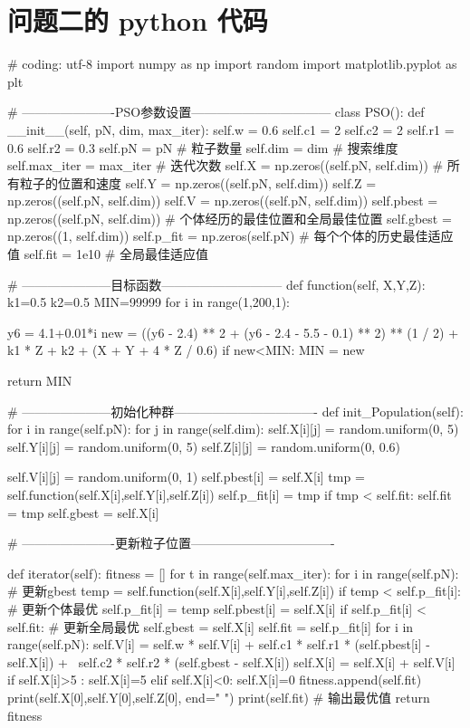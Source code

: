 \documentclass{MathorCupmodeling}
\begin{document}
	\section{问题二的 python 代码}
	\begin{python}
		# coding: utf-8
		import numpy as np
		import random
		import matplotlib.pyplot as plt
		
		
		# ----------------------PSO参数设置---------------------------------
		class PSO():
			def __init__(self, pN, dim, max_iter):
				self.w = 0.6
				self.c1 = 2
				self.c2 = 2
				self.r1 = 0.6
				self.r2 = 0.3
				self.pN = pN  # 粒子数量
				self.dim = dim  # 搜索维度
				self.max_iter = max_iter  # 迭代次数
				self.X = np.zeros((self.pN, self.dim))  # 所有粒子的位置和速度
				self.Y = np.zeros((self.pN, self.dim))
				self.Z = np.zeros((self.pN, self.dim))
				self.V = np.zeros((self.pN, self.dim))
				self.pbest = np.zeros((self.pN, self.dim))  # 个体经历的最佳位置和全局最佳位置
				self.gbest = np.zeros((1, self.dim))
				self.p_fit = np.zeros(self.pN)  # 每个个体的历史最佳适应值
				self.fit = 1e10  # 全局最佳适应值
		
			# ---------------------目标函数-----------------------------
			def function(self, X,Y,Z):
				k1=0.5
				k2=0.5
				MIN=99999
				for i in range(1,200,1):
		
					y6 = 4.1+0.01*i
					new = ((y6 - 2.4) ** 2 + (y6 - 2.4 - 5.5 - 0.1) ** 2) ** (1 / 2) + k1 * Z + k2 + (X + Y + 4 * Z / 0.6)
					if new<MIN:
						MIN = new
		
				return MIN
		
			# ---------------------初始化种群----------------------------------
			def init_Population(self):
				for i in range(self.pN):
					for j in range(self.dim):
						self.X[i][j] = random.uniform(0, 5)
						self.Y[i][j] = random.uniform(0, 5)
						self.Z[i][j] = random.uniform(0, 0.6)
		
						self.V[i][j] = random.uniform(0, 1)
					self.pbest[i] = self.X[i]
					tmp = self.function(self.X[i],self.Y[i],self.Z[i])
					self.p_fit[i] = tmp
					if tmp < self.fit:
						self.fit = tmp
						self.gbest = self.X[i]
		
						# ----------------------更新粒子位置----------------------------------
		
			def iterator(self):
				fitness = []
				for t in range(self.max_iter):
					for i in range(self.pN):  # 更新gbest\pbest
						temp = self.function(self.X[i],self.Y[i],self.Z[i])
						if temp < self.p_fit[i]:  # 更新个体最优
							self.p_fit[i] = temp
							self.pbest[i] = self.X[i]
							if self.p_fit[i] < self.fit:  # 更新全局最优
								self.gbest = self.X[i]
								self.fit = self.p_fit[i]
					for i in range(self.pN):
						self.V[i] = self.w * self.V[i] + self.c1 * self.r1 * (self.pbest[i] - self.X[i]) + \
									self.c2 * self.r2 * (self.gbest - self.X[i])
						self.X[i] = self.X[i] + self.V[i]
						if self.X[i]>5 :
							self.X[i]=5
						elif self.X[i]<0:
							self.X[i]=0
					fitness.append(self.fit)
					print(self.X[0],self.Y[0],self.Z[0], end=" ")
					print(self.fit)  # 输出最优值
				return fitness
		

\end{python}
\end{document}
